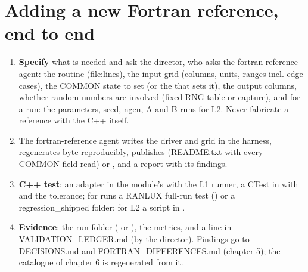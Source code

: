 \section{\texorpdfstring{Adding a new Fortran reference, end to end}{Adding a new Fortran reference, end to end}}\label{translation_report-02u5fvalidation:27-adding-a-new-fortran-reference-end-to-end}
\begin{enumerate}
\item \textbf{Specify} what is needed and ask the director, who asks the fortran-reference agent: the routine (file:\allowbreak{}lines),\allowbreak{} the
input grid (columns, units, ranges incl. edge cases), the COMMON state to set (or the  that sets it), the
output columns, whether random numbers are involved (fixed-RNG table or capture), and for a run: the 
parameters, seed, ngen, A and B runs for L2. Never fabricate a reference with the C++ itself.
\item The fortran-reference agent writes the driver and grid in the harness, regenerates byte-reproducibly,\allowbreak{} publishes
 (README.txt with every COMMON field read) or , and a report
 with its findings.
\item \textbf{C++ test}: an adapter in the module's  with the L1 runner, a CTest in
 with  and the tolerance; for runs a RANLUX full-run test
() or a regression\_\allowbreak{}shipped folder; for L2 a script in .
\item \textbf{Evidence}: the run folder ( or ), the metrics, and a line in
VALIDATION\_\allowbreak{}LEDGER.md (by the director). Findings go to DECISIONS.md and FORTRAN\_\allowbreak{}DIFFERENCES.md (chapter 5); the catalogue of chapter 6 is regenerated from it.
\end{enumerate}
